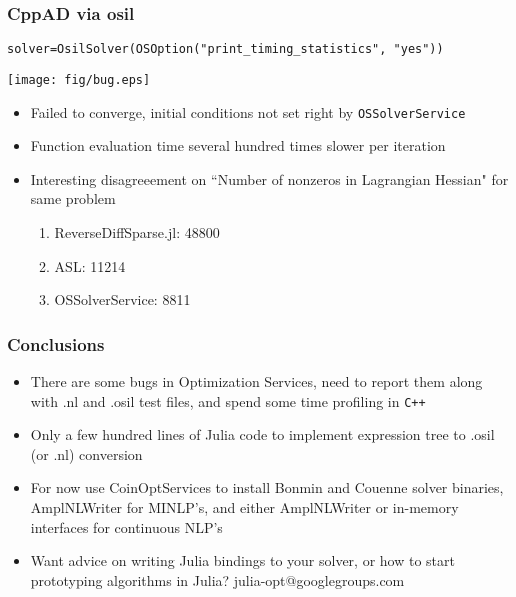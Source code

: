 \documentclass[compressed,dvips,letter]{beamer}
\begin{document}
\begin{frame}[fragile]\frametitle{CppAD via osil}
{\footnotesize \texttt{solver=OsilSolver(OSOption("print\_timing\_statistics", "yes"))}}
\begin{center}
\texttt{[image: fig/bug.eps]}
\end{center}
\vspace{-15pt}
\begin{itemize}
\item Failed to converge, initial conditions not set right by \texttt{OSSolverService}
\item Function evaluation time several hundred times slower per iteration
\item Interesting disagreeement on ``Number of nonzeros in Lagrangian Hessian" for same problem
\begin{enumerate}
\item ReverseDiffSparse.jl: 48800
\item ASL: 11214
\item OSSolverService: 8811
\end{enumerate}
\end{itemize}
\end{frame}
%
%



\begin{frame}[fragile]\frametitle{Conclusions}
\begin{itemize}
  \item There are some bugs in Optimization Services, need to report them along with .nl and .osil test files, and spend some time profiling in \texttt{C++}
  \item Only a few hundred lines of Julia code to implement expression tree to .osil (or .nl) conversion
  \item For now use CoinOptServices to install Bonmin and Couenne solver binaries, AmplNLWriter for MINLP's, and either AmplNLWriter or in-memory interfaces for continuous NLP's
  \item Want advice on writing Julia bindings to your solver, or how to start prototyping algorithms in Julia? {\footnotesize {}\selectfont julia-opt@googlegroups.com}
\end{itemize}

\end{frame}
%
%
\end{document}
